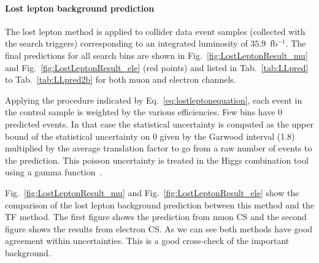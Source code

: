 \paragraph{Lost lepton background prediction}

The lost lepton method is applied to collider data event samples (collected with the search triggers) corresponding to an integrated
luminosity of $35.9$~fb$^{-1}$. 
The final predictions for all search bins are 
shown in Fig.~\ref{fig:LostLeptonResult_mu} and Fig.~\ref{fig:LostLeptonResult_ele} (red points) and listed in Tab.~\ref{tab:LLpred} to Tab.~\ref{tab:LLpred2b} for both muon and electron channels.%

Applying the procedure indicated by Eq.~\ref{eq:lostleptonequation}, each event in the control sample is weighted by the various efficiencies. %
Few bins have $0$ predicted events.
In that case the statistical uncertainty is computed as the upper bound of the statistical uncertainty on 0 given by the Garwood interval (1.8) multiplied by the average translation factor to go from a raw number of events to the prediction. %
This poisson uncertainty is treated in the Higgs combination tool using a gamma function~\cite{HiggsCombine,cms-note-2011-005}.

Fig.~\ref{fig:LostLeptonResult_mu} and Fig.~\ref{fig:LostLeptonResult_ele} show the comparison of the lost lepton background prediction between this method and the TF method.
The first figure shows the prediction from muon CS and the second figure shows the results from electron CS. As we can see both methods have good agreement within uncertainties. This is a good cross-check of the important background.

